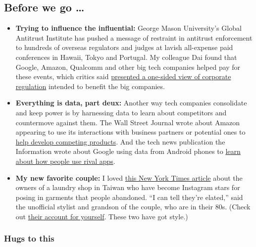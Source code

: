 \hypertarget{before-we-go-}{%
\subsection{Before we go \ldots{}}\label{before-we-go-}}

\begin{itemize}
\item
  \textbf{Trying to influence the influential:} George Mason
  University's Global Antitrust Institute has pushed a message of
  restraint in antitrust enforcement to hundreds of overseas regulators
  and judges at lavish all-expense paid conferences in Hawaii, Tokyo and
  Portugal. My colleague Dai found that Google, Amazon, Qualcomm and
  other big tech companies helped pay for these events, which critics
  said
  \href{https://www.nytimes3xbfgragh.onion/2020/07/24/technology/global-antitrust-institute-google-amazon-qualcomm.html}{presented
  a one-sided view of corporate regulation} intended to benefit the big
  companies.
\item
  \textbf{Everything is data, part deux:} Another way tech companies
  consolidate and keep power is by harnessing data to learn about
  competitors and countermove against them. The Wall Street Journal
  wrote about Amazon appearing to use its interactions with business
  partners or potential ones to
  \href{https://www.wsj.com/articles/amazon-tech-startup-echo-bezos-alexa-investment-fund-11595520249?mod=searchresults\&page=1\&pos=1}{help
  develop competing products}. And the tech news publication the
  Information wrote about Google using data from Android phones to
  \href{https://www.theinformation.com/articles/internal-google-program-taps-data-on-rival-android-apps}{learn
  about how people use rival apps}.
\item
  \textbf{My new favorite couple:} I loved
  \href{https://www.nytimes3xbfgragh.onion/2020/07/24/world/asia/taiwan-octogenarian-couple-instagram-laundry.html}{this
  New York Times article} about the owners of a laundry shop in Taiwan
  who have become Instagram stars for posing in garments that people
  abandoned. ``I can tell they're elated,'' said the unofficial stylist
  and grandson of the couple, who are in their 80s. (Check out
  \href{https://www.instagram.com/wantshowasyoung/}{their account for
  yourself}. These two have got style.)
\end{itemize}

\hypertarget{hugs-to-this}{%
\subsubsection{Hugs to this}\label{hugs-to-this}}

